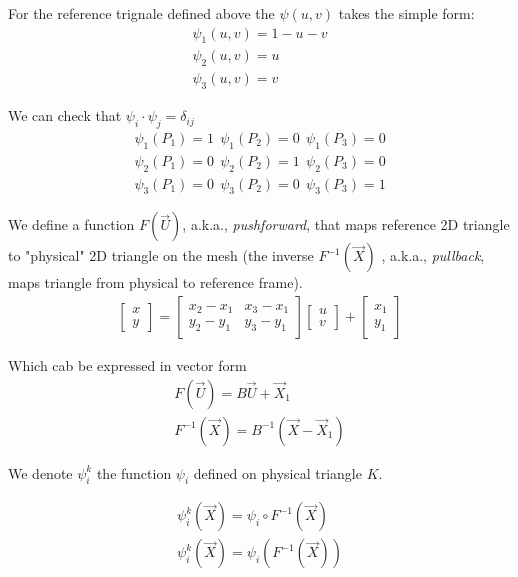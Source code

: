 \documentclass{birkjour}
\numberwithin{equation}{section}
\begin{document}
For the reference trignale defined above the $\psi(u,v)$ takes the simple form:
\begin{eqnarray} 
	\psi_1(u,v) = 1 - u - v \nonumber\\
	\psi_2(u,v) = u \nonumber\\
	\psi_3(u,v) = v \nonumber
\end{eqnarray}

We can check that $\psi_i \cdot \psi_j = \delta_{ij}$
\begin{eqnarray} 
\psi_1(P_1) = 1 \ \  \psi_1(P_2) = 0  \ \  \psi_1(P_3) = 0 \nonumber\\
\psi_2(P_1) = 0 \ \  \psi_2(P_2) = 1  \ \  \psi_2(P_3) = 0 \nonumber\\
\psi_3(P_1) = 0 \ \  \psi_3(P_2) = 0  \ \  \psi_3(P_3) = 1 \nonumber
\end{eqnarray}

We define a function $F(\vec U)$, a.k.a., \emph{pushforward}, that maps reference 2D triangle to "physical" 2D triangle on the mesh
(the inverse $F^{-1}(\vec X)$ , a.k.a., \emph{pullback}, maps triangle from physical to reference frame).
\begin{eqnarray}
	\left[\begin{array}{c}
		x \\
		y
	\end{array}\right] = 
	\left[\begin{array}{cc}
		x_2 - x_1 &  x_3 - x_1 \\
		y_2 - y_1 &  y_3 - y_1
	\end{array}\right] 
	\left[\begin{array}{c}
		u \\
		v
	\end{array}\right] +
	\left[\begin{array}{c}
		x_1 \\
		y_1
	\end{array}\right] \nonumber
\end{eqnarray}

Which cab be expressed in vector form
\begin{eqnarray} 
	F(\vec U) =  B \vec U + \vec X_1 \nonumber\\
	F^{-1}(\vec X)  = B^{-1} (\vec X - \vec X_1) \nonumber
\end{eqnarray}


We denote $\psi^k_i$ the function $\psi_i$ defined on physical triangle $K$.

\begin{eqnarray} 
	\psi^k_i(\vec X) = \psi_i \circ  F^{-1}(\vec X) \nonumber\\
	\psi^k_i(\vec X) = \psi_i( F^{-1}(\vec X) ) \nonumber
\end{eqnarray}
\end{document}
